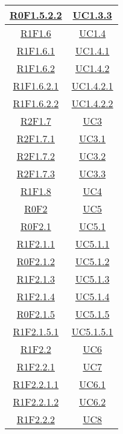 \begin{longtable}{|c|c|}
	\hyperlink{R0F1.5.2.2}{R0F1.5.2.2} & \hyperlink{UC1.3.3}{UC1.3.3}\\
	\hline
	\hyperlink{R1F1.6}{R1F1.6} & \hyperlink{UC1.4}{UC1.4}\\
	\hline
	\hyperlink{R1F1.6.1}{R1F1.6.1} & \hyperlink{UC1.4.1}{UC1.4.1}\\
	\hline
	\hyperlink{R1F1.6.2}{R1F1.6.2} & \hyperlink{UC1.4.2}{UC1.4.2}\\
	\hline
	\hyperlink{R1F1.6.2.1}{R1F1.6.2.1} & \hyperlink{UC1.4.2.1}{UC1.4.2.1}\\
	\hline
	\hyperlink{R1F1.6.2.2}{R1F1.6.2.2} & \hyperlink{UC1.4.2.2}{UC1.4.2.2}\\
	\hline
	\hyperlink{R2F1.7}{R2F1.7} & \hyperlink{UC3}{UC3}\\
	\hline
	\hyperlink{R2F1.7.1}{R2F1.7.1} & \hyperlink{UC3.1}{UC3.1}\\
	\hline
	\hyperlink{R2F1.7.2}{R2F1.7.2} & \hyperlink{UC3.2}{UC3.2}\\
	\hline
	\hyperlink{R2F1.7.3}{R2F1.7.3} & \hyperlink{UC3.3}{UC3.3}\\
	\hline
	\hyperlink{R1F1.8}{R1F1.8} & \hyperlink{UC4}{UC4}\\
	\hline
	\hyperlink{R0F2}{R0F2} & \hyperlink{UC5}{UC5}\\
	\hline
	\hyperlink{R0F2.1}{R0F2.1} & \hyperlink{UC5.1}{UC5.1}\\
	\hline
	\hyperlink{R1F2.1.1}{R1F2.1.1} & \hyperlink{UC5.1.1}{UC5.1.1}\\
	\hline
	\hyperlink{R0F2.1.2}{R0F2.1.2} & \hyperlink{UC5.1.2}{UC5.1.2}\\
	\hline
	\hyperlink{R1F2.1.3}{R1F2.1.3} & \hyperlink{UC5.1.3}{UC5.1.3}\\
	\hline
	\hyperlink{R1F2.1.4}{R1F2.1.4} & \hyperlink{UC5.1.4}{UC5.1.4}\\
	\hline
	\hyperlink{R0F2.1.5}{R0F2.1.5} & \hyperlink{UC5.1.5}{UC5.1.5}\\
	\hline
	\hyperlink{R1F2.1.5.1}{R1F2.1.5.1} & \hyperlink{UC5.1.5.1}{UC5.1.5.1}\\
	\hline
	\hyperlink{R1F2.2}{R1F2.2} & \hyperlink{UC6}{UC6}\\
	\hline
	\hyperlink{R1F2.2.1}{R1F2.2.1} & \hyperlink{UC7}{UC7}\\
	\hline
	\hyperlink{R1F2.2.1.1}{R1F2.2.1.1} & \hyperlink{UC6.1}{UC6.1}\\
	\hline
	\hyperlink{R1F2.2.1.2}{R1F2.2.1.2} & \hyperlink{UC6.2}{UC6.2}\\
	\hline
	\hyperlink{R1F2.2.2}{R1F2.2.2} & \hyperlink{UC8}{UC8}\\

\end{longtable}
